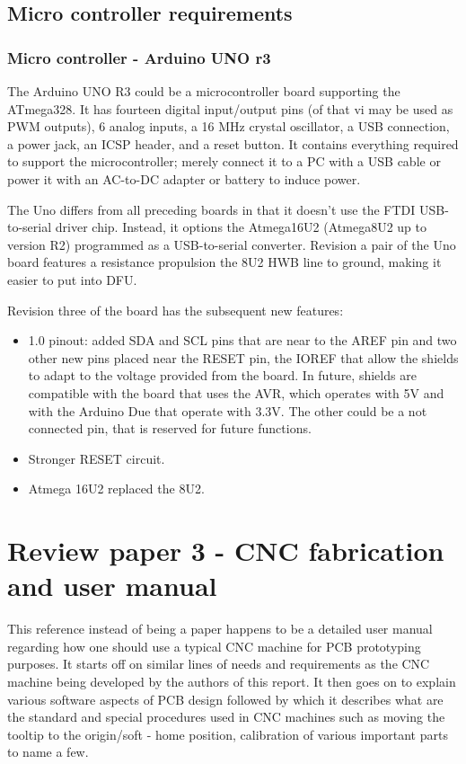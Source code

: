 \subsection{Micro controller requirements}

\subsubsection*{Micro controller - Arduino UNO r3}
The Arduino UNO R3 could be a microcontroller board supporting the ATmega328. It has fourteen digital input/output pins (of that vi may be used as PWM outputs), 6 analog inputs, a 16 MHz crystal oscillator, a USB connection, a power jack, an ICSP header, and a reset button. It contains everything required to support the microcontroller; merely connect it to a PC with a USB cable or power it with an AC-to-DC adapter or battery to induce power. \par

The Uno differs from all preceding boards in that it doesn't use the FTDI USB-to-serial driver chip. Instead, it options the Atmega16U2 (Atmega8U2 up to version R2) programmed as a USB-to-serial converter.
Revision a pair of the Uno board features a resistance propulsion the 8U2 HWB line to ground, making it easier to put into DFU.

Revision three of the board has the subsequent new features:

\begin{itemize}
 \item 1.0 pinout: added SDA and SCL pins that are near to the AREF pin and two other new pins placed near the RESET pin, the IOREF that allow the shields to adapt to the voltage provided from the board. In future, shields are compatible with the board that uses the AVR, which operates with 5V and with the Arduino Due that operate with 3.3V. The other could be a not connected pin, that is reserved for future functions.
 \item Stronger RESET circuit.
 \item Atmega 16U2 replaced the 8U2.
\end{itemize}


\section{Review paper 3 - CNC fabrication and user manual} \label{Sec:3}

This reference instead of being a paper happens to be a detailed user manual regarding how one should use a typical CNC machine for PCB prototyping purposes. It starts off on similar lines of needs and requirements as the CNC machine being developed by the authors of this report. It then goes on to explain various software aspects of PCB design followed by which it describes what are the standard and special procedures used in CNC machines such as moving the tooltip to the origin/soft - home position, calibration of various important parts to name a few. \par

